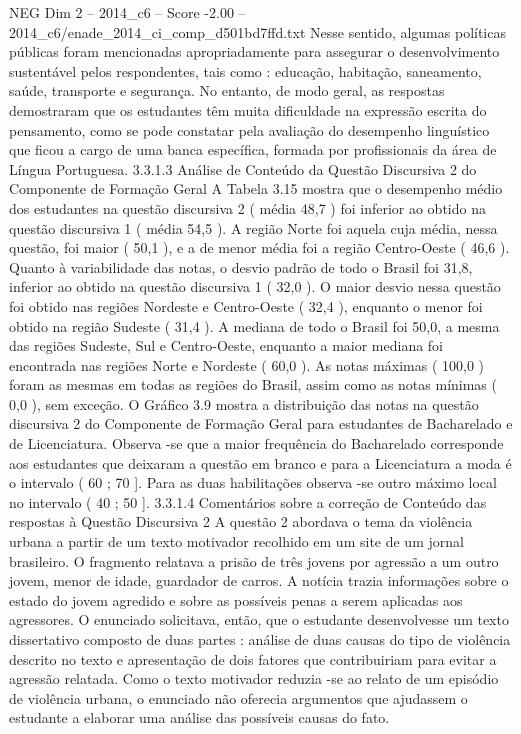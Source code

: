 \begin{textsample}{NEG Dim 2 – 2014\_c6 – Score -2.00 – 2014\_c6/enade\_2014\_ci\_comp\_d501bd7ffd.txt}
Nesse sentido, algumas políticas públicas foram mencionadas apropriadamente para assegurar o desenvolvimento sustentável pelos respondentes, tais como : educação, habitação, saneamento, saúde, transporte e segurança.
No entanto, de modo geral, as respostas demostraram que os estudantes têm muita dificuldade na expressão escrita do pensamento, como se pode constatar pela avaliação do desempenho linguístico que ficou a cargo de uma banca específica, formada por profissionais da área de Língua Portuguesa. 3.3.1.3 Análise de Conteúdo da Questão Discursiva 2 do Componente de Formação Geral A Tabela 3.15 mostra que o desempenho médio dos estudantes na questão discursiva 2 ( média 48,7 ) foi inferior ao obtido na questão discursiva 1 ( média 54,5 ).
A região Norte foi aquela cuja média, nessa questão, foi maior ( 50,1 ), e a de menor média foi a região Centro-Oeste ( 46,6 ).
Quanto à variabilidade das notas, o desvio padrão de todo o Brasil foi 31,8, inferior ao obtido na questão discursiva 1 ( 32,0 ).
O maior desvio nessa questão foi obtido nas regiões Nordeste e Centro-Oeste ( 32,4 ), enquanto o menor foi obtido na região Sudeste ( 31,4 ).
A mediana de todo o Brasil foi 50,0, a mesma das regiões Sudeste, Sul e Centro-Oeste, enquanto a maior mediana foi encontrada nas regiões Norte e Nordeste ( 60,0 ).
As notas máximas ( 100,0 ) foram as mesmas em todas as regiões do Brasil, assim como as notas mínimas ( 0,0 ), sem exceção.
O Gráfico 3.9 mostra a distribuição das notas na questão discursiva 2 do Componente de Formação Geral para estudantes de Bacharelado e de Licenciatura.
Observa -se que a maior frequência do Bacharelado corresponde aos estudantes que deixaram a questão em branco e para a Licenciatura a moda é o intervalo ( 60 ; 70 ].
Para as duas habilitações observa -se outro máximo local no intervalo ( 40 ; 50 ]. 3.3.1.4 Comentários sobre a correção de Conteúdo das respostas à Questão Discursiva 2 A questão 2 abordava o tema da violência urbana a partir de um texto motivador recolhido em um site de um jornal brasileiro.
O fragmento relatava a prisão de três jovens por agressão a um outro jovem, menor de idade, guardador de carros.
A notícia trazia informações sobre o estado do jovem agredido e sobre as possíveis penas a serem aplicadas aos agressores.
O enunciado solicitava, então, que o estudante desenvolvesse um texto dissertativo composto de duas partes : análise de duas causas do tipo de violência descrito no texto e apresentação de dois fatores que contribuiriam para evitar a agressão relatada.
Como o texto motivador reduzia -se ao relato de um episódio de violência urbana, o enunciado não oferecia argumentos que ajudassem o estudante a elaborar uma análise das possíveis causas do fato.

\end{textsample}
